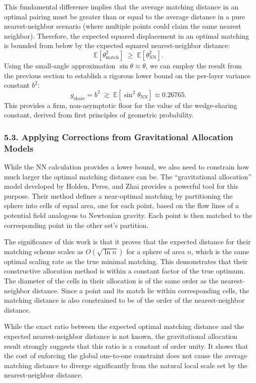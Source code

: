 \documentclass[11pt]{article}
\begin{document}
This fundamental difference implies that the average matching distance in an optimal pairing must be greater than or equal to the average distance in a pure nearest-neighbor scenario (where multiple points could claim the same nearest neighbor). Therefore, the expected squared displacement in an optimal matching is bounded from below by the expected squared nearest-neighbor distance:
\[
\mathbb{E}[\theta^2_{\text{match}}] \;\ge\; \mathbb{E}[\theta^2_{\mathrm{NN}}].
\]
Using the small-angle approximation $\sin\theta \approx \theta$, we can employ the result from the previous section to establish a rigorous lower bound on the per-layer variance constant $b^2$:
\[
g_{\mathrm{share}} = b^2 \;\gtrsim\; \mathbb{E}[\sin^2\theta_{\mathrm{NN}}] \approx 0.26765.
\]
This provides a firm, non-asymptotic floor for the value of the wedge-sharing constant, derived from first principles of geometric probability.

\subsubsection*{5.3. Applying Corrections from Gravitational Allocation Models}
While the NN calculation provides a lower bound, we also need to constrain how much larger the optimal matching distance can be. The “gravitational allocation” model developed by Holden, Peres, and Zhai provides a powerful tool for this purpose. Their method defines a near-optimal matching by partitioning the sphere into cells of equal area, one for each point, based on the flow lines of a potential field analogous to Newtonian gravity. Each point is then matched to the corresponding point in the other set’s partition.

The significance of this work is that it proves that the expected distance for their matching scheme scales as $O(\sqrt{\ln n})$ for a sphere of area $n$, which is the same optimal scaling rate as the true minimal matching. This demonstrates that their constructive allocation method is within a constant factor of the true optimum. The diameter of the cells in their allocation is of the same order as the nearest-neighbor distance. Since a point and its match lie within corresponding cells, the matching distance is also constrained to be of the order of the nearest-neighbor distance.

While the exact ratio between the expected optimal matching distance and the expected nearest-neighbor distance is not known, the gravitational allocation result strongly suggests that this ratio is a constant of order unity. It shows that the cost of enforcing the global one-to-one constraint does not cause the average matching distance to diverge significantly from the natural local scale set by the nearest-neighbor distance.
\end{document}
